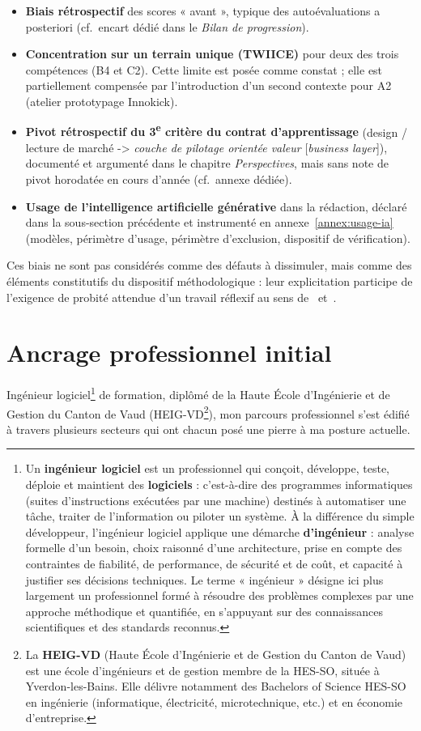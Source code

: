 \begin{itemize}
    \item \textbf{Biais rétrospectif} des scores « avant », typique des autoévaluations a posteriori (cf.~encart dédié dans le \emph{Bilan de progression}).
    \item \textbf{Concentration sur un terrain unique (TWIICE)} pour deux des trois compétences (B4 et C2). Cette limite est posée comme constat ; elle est partiellement compensée par l'introduction d'un second contexte pour A2 (atelier prototypage Innokick).
    \item \textbf{Pivot rétrospectif du 3\textsuperscript{e} critère du contrat d'apprentissage} (design / lecture de marché -> \emph{couche de pilotage orientée valeur} [\textit{business layer}]), documenté et argumenté dans le chapitre \emph{Perspectives}, mais sans note de pivot horodatée en cours d'année (cf.~annexe dédiée).
    \item \textbf{Usage de l'intelligence artificielle générative} dans la rédaction, déclaré dans la sous-section précédente et instrumenté en annexe~\ref{annex:usage-ia} (modèles, périmètre d'usage, périmètre d'exclusion, dispositif de vérification).
\end{itemize}

Ces biais ne sont pas considérés comme des défauts à dissimuler, mais comme des éléments constitutifs du dispositif méthodologique : leur explicitation participe de l'exigence de probité attendue d'un travail réflexif au sens de~\citet{schon1994} et~\citet{perrenoud2001}.

\section{Ancrage professionnel initial}

Ingénieur logiciel\footnote{Un \textbf{ingénieur logiciel} est un professionnel qui conçoit, développe, teste, déploie et maintient des \textbf{logiciels} : c'est-à-dire des programmes informatiques (suites d'instructions exécutées par une machine) destinés à automatiser une tâche, traiter de l'information ou piloter un système. À la différence du simple développeur, l'ingénieur logiciel applique une démarche \textbf{d'ingénieur} : analyse formelle d'un besoin, choix raisonné d'une architecture, prise en compte des contraintes de fiabilité, de performance, de sécurité et de coût, et capacité à justifier ses décisions techniques. Le terme « ingénieur » désigne ici plus largement un professionnel formé à résoudre des problèmes complexes par une approche méthodique et quantifiée, en s'appuyant sur des connaissances scientifiques et des standards reconnus.\label{fn:ingenieur-logiciel}} de formation, diplômé de la Haute École d'Ingénierie et de Gestion du Canton de Vaud (HEIG-VD\footnote{La \textbf{HEIG-VD} (Haute École d'Ingénierie et de Gestion du Canton de Vaud) est une école d'ingénieurs et de gestion membre de la HES-SO, située à Yverdon-les-Bains. Elle délivre notamment des Bachelors of Science HES-SO en ingénierie (informatique, électricité, microtechnique, etc.) et en économie d'entreprise.}), mon parcours professionnel s'est édifié à travers plusieurs secteurs qui ont chacun posé une pierre à ma posture actuelle.


